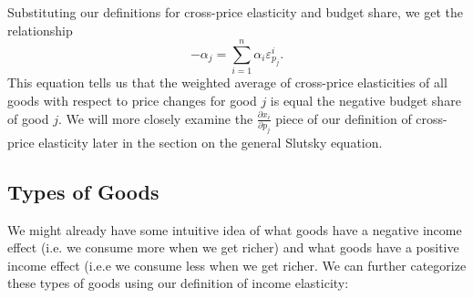 Substituting our definitions for cross-price elasticity and budget share, we get the relationship
$$
-\alpha_{j}=\sum_{i=1}^{n} \alpha_{i} \varepsilon_{p_{j}}^{i}.
$$
This equation tells us that the weighted average of cross-price elasticities of all goods with respect to price changes for good $j$ is equal the negative budget share of good $j$. We will more closely examine the $\frac{\partial x_{i}}{\partial p_j}$ piece of our definition of cross-price elasticity later in the section on the general Slutsky equation.

\subsection*{Types of Goods}

We might already have some intuitive idea of what goods have a negative income effect (i.e. we consume more when we get richer) and what goods have a positive income effect (i.e.e we consume less when we get richer. We can further categorize these types of goods using our definition of income elasticity:
